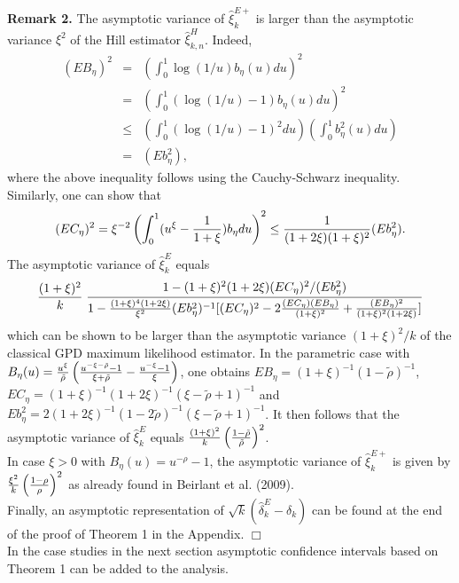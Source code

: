 \documentclass[twoside,leqno,11pt]{article}
\begin{document}
\vspace{0.3cm}\noindent
{\bf Remark 2.} The asymptotic variance of $\hat{\xi}_k^{E+}$ is larger than the asymptotic variance $\xi^2$ of the Hill estimator $\hat{\xi}^H_{k,n}$. Indeed, 
\begin{eqnarray*}
(EB_\eta)^2 &=& \left( \int_0^1 \log (1/u) b_{\eta}(u) du \right)^2 \\
&=& \left( \int_0^1 (\log (1/u) -1) b_{\eta}(u) du \right)^2 \\
&\leq & \left( \int_0^1 (\log (1/u) -1)^2 du \right)
\left( \int_0^1 b^2_{\eta}(u) du \right)\\
&=& (Eb^2_\eta),
\end{eqnarray*}
where the above inequality follows using the Cauchy-Schwarz inequality.  \\
Similarly, one can show that
\[
(EC_\eta)^2= \xi^{-2} \left(\int_0^1 (u^\xi -{1 \over 1+\xi})b_\eta du \right)^2 \leq {1 \over (1+2\xi)(1+\xi)^2}
(Eb^2_\eta).
\]
The asymptotic variance of  $\hat{\xi}_k^{E}$ equals 
\[
{(1+\xi)^2 \over k} \;
\frac{1- (1+\xi)^2(1+2\xi)(EC_\eta)^2/(Eb_\eta^2)}
{1- {(1+\xi)^4(1+2\xi)\over \xi^2} (Eb_\eta^2)^{-1}
[(EC_\eta)^2 -2 {(EC_\eta)(EB_\eta)\over (1+\xi)^2}+ {(EB_\eta)^2 \over (1+\xi)^{2}(1+2\xi)}]
}
\]
which can be shown to be larger than the asymptotic variance $(1+\xi)^2/k$ of the classical GPD maximum likelihood estimator. In the parametric case with $B_\eta (u) = {u^{\xi} \over \tilde\rho}\left({u^{-\xi -\tilde{\rho}}-1 \over \xi +\tilde\rho}- {u^{-\xi}-1 \over \xi}\right)$, one obtains  $EB_\eta = (1+\xi)^{-1}(1-\tilde\rho)^{-1}$, $EC_\eta = (1+\xi)^{-1}(1+2\xi)^{-1}
(\xi-\tilde\rho+1)^{-1}$ and $Eb^2_\eta = 2 (1+2\xi)^{-1}(1-2\tilde\rho)^{-1}(\xi-\tilde\rho+1)^{-1}$. It then follows that the asymptotic variance of $\hat{\xi}_k^{E}$ equals ${(1+\xi)^2 \over k} \left(\frac{1-\tilde\rho}{\tilde\rho}\right)^2$.\\
In case $\xi >0$  with $B_\eta (u)= u^{-\rho}-1$, the asymptotic variance of  $\hat{\xi}_k^{E+}$ is given by  ${\xi^2 \over k} \left(\frac{1-\rho}{\rho}\right)^2$ as already found in Beirlant et al. (2009). \\
Finally, an asymptotic representation of $\sqrt{k}(\hat{\delta}_k^{E}-\delta_k)$ can be found at the end of the proof of Theorem 1 in the Appendix.
$\Box$\\

\noindent
In the case studies in the next section asymptotic confidence intervals  based on Theorem 1 can be added to the analysis. \\
\end{document}
